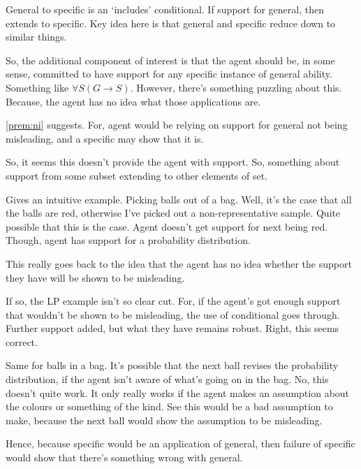 \begin{note}[`includes']
  General to specific is an `includes' conditional.
  If support for general, then extends to specific.
  Key idea here is that general and specific reduce down to similar things.

  So, the additional component of interest is that the agent should be, in some sense, committed to have support for any specific instance of general ability.
  Something like \(\forall S(G \rightarrow S)\).
  However, there's something puzzling about this.
  Because, the agent has no idea what those applications are.

  \ref{prem:ni} suggests.
  For, agent would be relying on support for general not being misleading, and a specific may show that it is.


  
  So, it seems this doesn't provide the agent with support.
  So, something about support from some subset extending to other elements of set.

  Gives an intuitive example.
  Picking balls out of a bag.
  Well, it's the case that all the balls are red, otherwise I've picked out a non-representative sample.
  Quite possible that this is the case.
  Agent doesn't get support for next being red.
  Though, agent has support for a probability distribution.

  This really goes back to the idea that the agent has no idea whether the support they have will be shown to be misleading.

  If so, the LP example isn't so clear cut.
  For, if the agent's got enough support that wouldn't be shown to be misleading, the use of conditional goes through.
  Further support added, but what they have remains robust.
  Right, this seems correct.

  Same for balls in a bag.
  It's possible that the next ball revises the probability distribution, if the agent isn't aware of what's going on in the bag.
  No, this doesn't quite work.
  It only really works if the agent makes an assumption about the colours or something of the kind.
  See this would be a bad assumption to make, because the next ball would show the assumption to be misleading.

  Hence, because specific would be an application of general, then failure of specific would show that there's something wrong with general.
\end{note}

